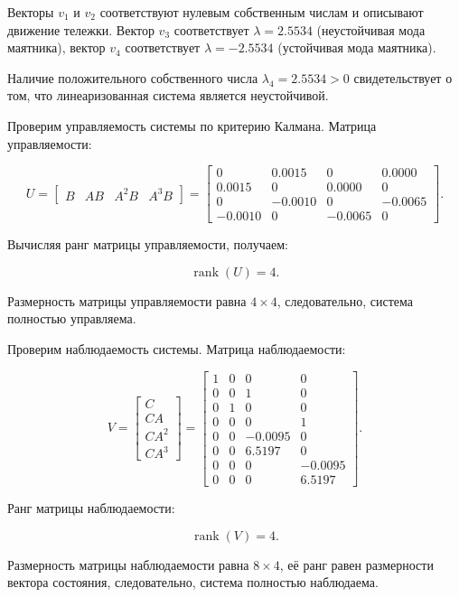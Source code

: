 \documentclass[a4paper,12pt]{article}
\begin{document}
Векторы $v_1$ и $v_2$ соответствуют нулевым собственным числам и описывают движение тележки. Вектор $v_3$ соответствует $\lambda = 2.5534$ (неустойчивая мода маятника), вектор $v_4$ соответствует $\lambda = -2.5534$ (устойчивая мода маятника).



Наличие положительного собственного числа \(\lambda_4 = 2.5534 > 0\) свидетельствует о том, что линеаризованная система является неустойчивой. 

Проверим управляемость системы по критерию Калмана. Матрица управляемости:

\[
U = \begin{bmatrix}
	B & AB & A^2B & A^3B
\end{bmatrix} =
\begin{bmatrix}
	0 & 0.0015 & 0 & 0.0000 \\
	0.0015 & 0 & 0.0000 & 0 \\
	0 & -0.0010 & 0 & -0.0065 \\
	-0.0010 & 0 & -0.0065 & 0
\end{bmatrix}.
\]

Вычисляя ранг матрицы управляемости, получаем:

\[
\operatorname{rank}(U) = 4.
\]

Размерность матрицы управляемости равна \(4 \times 4\), следовательно, система полностью управляема.

Проверим наблюдаемость системы. Матрица наблюдаемости:

\[
V = \begin{bmatrix}
	C \\ CA \\ CA^2 \\ CA^3
\end{bmatrix} =
\begin{bmatrix}
	1 & 0 & 0 & 0 \\
	0 & 0 & 1 & 0 \\
	0 & 1 & 0 & 0 \\
	0 & 0 & 0 & 1 \\
	0 & 0 & -0.0095 & 0 \\
	0 & 0 & 6.5197 & 0 \\
	0 & 0 & 0 & -0.0095 \\
	0 & 0 & 0 & 6.5197
\end{bmatrix}.
\]

Ранг матрицы наблюдаемости:

\[
\operatorname{rank}(V) = 4.
\]

Размерность матрицы наблюдаемости равна \(8 \times 4\), её ранг равен размерности вектора состояния, следовательно, система полностью наблюдаема.
\end{document}
